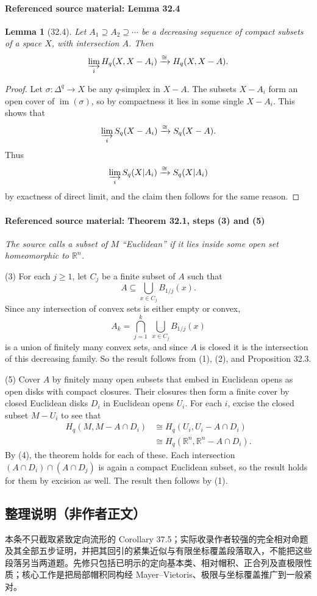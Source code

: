 \documentclass[UTF8,11pt]{ctexart}
\newtheorem*{lemma}{Lemma}
\theoremstyle{definition}
\DeclareMathOperator{\im}{im}
\newcommand{\R}{\mathbb R}
\begin{document}
\paragraph{Referenced source material: Lemma 32.4}
\begin{lemma}[32.4]
Let $A_1\supseteq A_2\supseteq\cdots$ be a decreasing sequence of compact subsets of a space $X$, with intersection $A$. Then
\[
\varinjlim_i H_q(X,X-A_i)\xrightarrow{\cong}H_q(X,X-A).
\]
\end{lemma}
\begin{proof}
Let $\sigma:\Delta^q\to X$ be any $q$-simplex in $X-A$. The subsets $X-A_i$ form an open cover of $\im(\sigma)$, so by compactness it lies in some single $X-A_i$. This shows that
\[
\varinjlim_i S_q(X-A_i)\xrightarrow{\cong}S_q(X-A).
\]
Thus
\[
\varinjlim_i S_q(X|A_i)\xrightarrow{\cong}S_q(X|A_i)
\]
by exactness of direct limit, and the claim then follows for the same reason.
\end{proof}
\paragraph{Referenced source material: Theorem 32.1, steps (3) and (5)}
\noindent\textit{The source calls a subset of $M$ ``Euclidean'' if it lies inside some open set homeomorphic to $\R^n$.}

(3) For each $j\geq1$, let $C_j$ be a finite subset of $A$ such that
\[
A\subseteq\bigcup_{x\in C_j}B_{1/j}(x).
\]
Since any intersection of convex sets is either empty or convex,
\[
A_k=\bigcap_{j=1}^k\ \bigcup_{x\in C_j}B_{1/j}(x)
\]
is a union of finitely many convex sets, and since $A$ is closed it is the intersection of this decreasing family. So the result follows from (1), (2), and Proposition 32.3.

(5) Cover $A$ by finitely many open subsets that embed in Euclidean opens as open disks with compact closures. Their closures then form a finite cover by closed Euclidean disks $D_i$ in Euclidean opens $U_i$. For each $i$, excise the closed subset $M-U_i$ to see that
\begin{align*}
H_q(M,M-A\cap D_i)&\cong H_q(U_i,U_i-A\cap D_i)\\
&\cong H_q(\R^n,\R^n-A\cap D_i).
\end{align*}
By (4), the theorem holds for each of these. Each intersection $(A\cap D_i)\cap(A\cap D_j)$ is again a compact Euclidean subset, so the result holds for them by excision as well. The result then follows by (1).

\subsection*{整理说明（非作者正文）}
本条不只截取紧致定向流形的 Corollary 37.5；实际收录作者较强的完全相对命题及其全部五步证明，并把其回引的紧集近似与有限坐标覆盖段落取入，不能把这些段落另当两道题。先修只包括已明示的定向基本类、相对帽积、正合列及直极限性质；核心工作是把局部帽积同构经 Mayer--Vietoris、极限与坐标覆盖推广到一般紧对。
\end{document}
